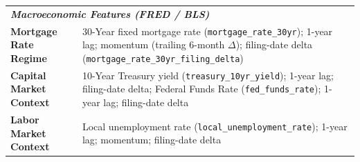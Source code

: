 \begin{table}[htbp]
\begin{tabular}{@{}p{} p{}@{}}
        \midrule
        \multicolumn{2}{l}{\textit{\textbf{Macroeconomic Features (FRED / BLS)}}} \\[2pt]
        \textbf{Mortgage Rate Regime}      & 30-Year fixed mortgage rate (\texttt{mortgage\_rate\_30yr}); 1-year lag; momentum (trailing 6-month $\Delta$); filing-date delta (\texttt{mortgage\_rate\_30yr\_filing\_delta}) \\
        \textbf{Capital Market Context}    & 10-Year Treasury yield (\texttt{treasury\_10yr\_yield}); 1-year lag; filing-date delta; Federal Funds Rate (\texttt{fed\_funds\_rate}); 1-year lag; filing-date delta \\
        \textbf{Labor Market Context}      & Local unemployment rate (\texttt{local\_unemployment\_rate}); 1-year lag; momentum; filing-date delta \\
        \bottomrule
    \end{tabular}
\end{table}
